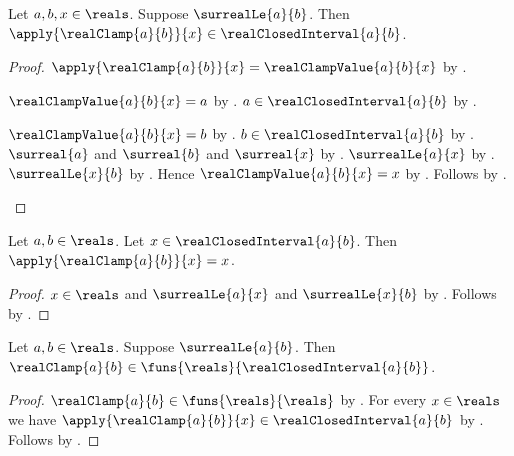 \begin{theorem}\label{real_clamp_in_closed_interval}
    Let $a,b,x\in\reals$.
    Suppose $\surrealLe{a}{b}$.
    Then
        $\apply{\realClamp{a}{b}}{x}\in\realClosedInterval{a}{b}$.
\end{theorem}
\begin{proof}
    $\apply{\realClamp{a}{b}}{x}=\realClampValue{a}{b}{x}$
        by .
    \begin{byCase}
        $\realClampValue{a}{b}{x}=a$
            by .
        $a\in\realClosedInterval{a}{b}$
            by
            .
        \begin{byCase}
            $\realClampValue{a}{b}{x}=b$
                by .
            $b\in\realClosedInterval{a}{b}$
                by
                .
            $\surreal{a}$ and $\surreal{b}$ and $\surreal{x}$
                by .
            $\surrealLe{a}{x}$
                by .
            $\surrealLe{x}{b}$
                by .
            Hence $\realClampValue{a}{b}{x}=x$
                by .
            Follows by .
        \end{byCase}
    \end{byCase}
\end{proof}

\begin{proposition}\label{real_clamp_fixes_closed_interval}
    Let $a,b\in\reals$.
    Let $x\in\realClosedInterval{a}{b}$.
    Then $\apply{\realClamp{a}{b}}{x}=x$.
\end{proposition}
\begin{proof}
    $x\in\reals$ and $\surrealLe{a}{x}$ and $\surrealLe{x}{b}$
        by .
    Follows by
        .
\end{proof}

\begin{theorem}\label{real_clamp_range}
    Let $a,b\in\reals$.
    Suppose $\surrealLe{a}{b}$.
    Then $\realClamp{a}{b}
        \in\funs{\reals}{\realClosedInterval{a}{b}}$.
\end{theorem}
\begin{proof}
    $\realClamp{a}{b}\in\funs{\reals}{\reals}$
        by .
    For every $x\in\reals$ we have
        $\apply{\realClamp{a}{b}}{x}\in\realClosedInterval{a}{b}$
        by .
    Follows by .
\end{proof}

